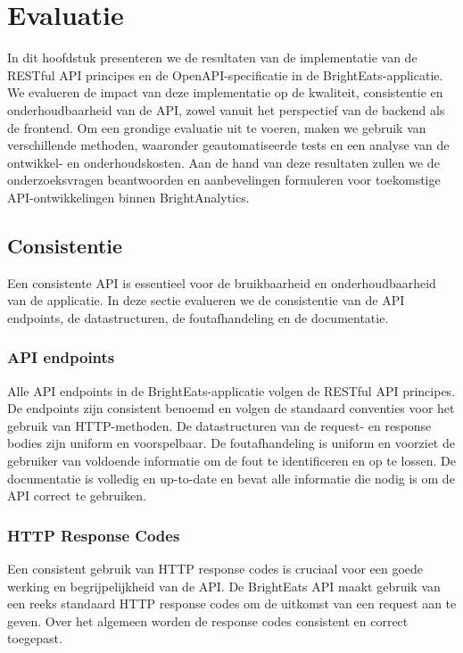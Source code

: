 \chapter{Evaluatie}
\label{ch:evaluatie}

In dit hoofdstuk presenteren we de resultaten van de implementatie van de RESTful API principes en de OpenAPI-specificatie in de BrightEats-applicatie. We evalueren de impact van deze implementatie op de kwaliteit, consistentie en onderhoudbaarheid van de API, zowel vanuit het perspectief van de backend als de frontend. Om een grondige evaluatie uit te voeren, maken we gebruik van verschillende methoden, waaronder geautomatiseerde tests en een analyse van de ontwikkel- en onderhoudskosten. Aan de hand van deze resultaten zullen we de onderzoeksvragen beantwoorden en aanbevelingen formuleren voor toekomstige API-ontwikkelingen binnen BrightAnalytics.

\section{Consistentie}

Een consistente API is essentieel voor de bruikbaarheid en onderhoudbaarheid van de applicatie. In deze sectie evalueren we de consistentie van de API endpoints, de datastructuren, de foutafhandeling en de documentatie.

\subsection{API endpoints}

Alle API endpoints in de BrightEats-applicatie volgen de RESTful API principes. De endpoints zijn consistent benoemd en volgen de standaard conventies voor het gebruik van HTTP-methoden. De datastructuren van de request- en response bodies zijn uniform en voorspelbaar. De foutafhandeling is uniform en voorziet de gebruiker van voldoende informatie om de fout te identificeren en op te lossen. De documentatie is volledig en up-to-date en bevat alle informatie die nodig is om de API correct te gebruiken.

\subsection{HTTP Response Codes}

Een consistent gebruik van HTTP response codes is cruciaal voor een goede werking en begrijpelijkheid van de API. De BrightEats API maakt gebruik van een reeks standaard HTTP response codes om de uitkomst van een request aan te geven. Over het algemeen worden de response codes consistent en correct toegepast.

